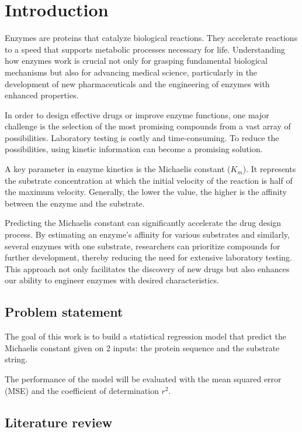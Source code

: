 
\chapter{Introduction}

Enzymes are proteins that catalyze biological reactions. They accelerate reactions 
to a speed that supports metabolic processes necessary for life. 
Understanding how enzymes work is crucial not only for grasping fundamental 
biological mechanisms but also for advancing medical science, 
particularly in the development of new pharmaceuticals and the engineering 
of enzymes with enhanced properties.

In order to design effective drugs or improve enzyme functions, 
one major challenge is the selection of the most promising compounds 
from a vast array of possibilities. 
Laboratory testing is costly and time-consuming. To reduce the possibilities,
using kinetic information can become a promising solution.

A key parameter in enzyme kinetics is the Michaelis constant ($K_m$). It represents
the substrate concentration at which the initial velocity of the reaction is half of
the maximum velocity. Generally, the lower the value, the higher is the affinity 
between the enzyme and the substrate.

Predicting the Michaelis constant can significantly accelerate the drug design process. 
By estimating an enzyme's affinity for various substrates and similarly, several enzymes
with one substrate, researchers can prioritize compounds for further development, 
thereby reducing the need for extensive laboratory testing. 
This approach not only facilitates the discovery of new drugs but also enhances 
our ability to engineer enzymes with desired characteristics.

\section{Problem statement}

The goal of this work is to build a statistical regression model that predict the 
Michaelis constant given on 2 inputs: the protein sequence and the substrate string. 

The performance of the model will be evaluated with the mean squared error (MSE) and 
the coefficient of determination $r^2$.

\section{Literature review}

